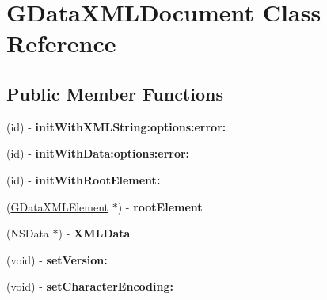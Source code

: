 \hypertarget{interface_g_data_x_m_l_document}{
\section{GDataXMLDocument Class Reference}
\label{interface_g_data_x_m_l_document}
}
\subsection*{Public Member Functions}
\begin{DoxyCompactItemize}
\item 
\hypertarget{interface_g_data_x_m_l_document_affa6920d0dfcedcd5bc0e21e74af971d}{
(id) -\/ {\bfseries initWithXMLString:options:error:}}
\label{interface_g_data_x_m_l_document_affa6920d0dfcedcd5bc0e21e74af971d}

\item 
\hypertarget{interface_g_data_x_m_l_document_a5aac20d1849c77ca0904fdd50e65491a}{
(id) -\/ {\bfseries initWithData:options:error:}}
\label{interface_g_data_x_m_l_document_a5aac20d1849c77ca0904fdd50e65491a}

\item 
\hypertarget{interface_g_data_x_m_l_document_ab91990967e0e050dfe889f9b67b0d4db}{
(id) -\/ {\bfseries initWithRootElement:}}
\label{interface_g_data_x_m_l_document_ab91990967e0e050dfe889f9b67b0d4db}

\item 
\hypertarget{interface_g_data_x_m_l_document_af6e96fd6b07f84044facaf26706f6497}{
(\hyperlink{interface_g_data_x_m_l_element}{GDataXMLElement} $\ast$) -\/ {\bfseries rootElement}}
\label{interface_g_data_x_m_l_document_af6e96fd6b07f84044facaf26706f6497}

\item 
\hypertarget{interface_g_data_x_m_l_document_a984d2f49915376794041612b8c7b0534}{
(NSData $\ast$) -\/ {\bfseries XMLData}}
\label{interface_g_data_x_m_l_document_a984d2f49915376794041612b8c7b0534}

\item 
\hypertarget{interface_g_data_x_m_l_document_ac43d5fecaa5ca156d4a2202604f63098}{
(void) -\/ {\bfseries setVersion:}}
\label{interface_g_data_x_m_l_document_ac43d5fecaa5ca156d4a2202604f63098}

\item 
\hypertarget{interface_g_data_x_m_l_document_a4c38b4821cf2fd94e0be91e5f58c47c5}{
(void) -\/ {\bfseries setCharacterEncoding:}}
\label{interface_g_data_x_m_l_document_a4c38b4821cf2fd94e0be91e5f58c47c5}


\end{DoxyCompactItemize}

